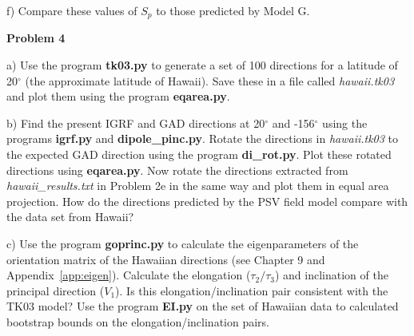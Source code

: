 {f) Compare these values of $S_p$   to those predicted by Model G. 



{\bf Problem 4}

a) Use the program {\bf tk03.py} to generate a set of 100 directions for a latitude of 20$^{\circ}$ (the approximate latitude of Hawaii). Save these in a file called {\it hawaii.tk03} and plot them using the program {\bf eqarea.py}.  

b)  Find the present IGRF and GAD directions at 20$^{\circ}$ and -156$^{\circ}$ using the programs {\bf igrf.py} and {\bf dipole\_pinc.py}.    Rotate the directions in {\it hawaii.tk03}  to the expected GAD direction using the program {\bf di\_rot.py}.  
Plot these rotated directions using {\bf eqarea.py}.  Now rotate the directions extracted from {\it hawaii\_results.txt} in Problem 2e in the same way and plot them in equal area projection.  How do the directions predicted by the PSV field model compare with the data set from Hawaii?  

c) Use the program {\bf goprinc.py} to calculate the eigenparameters of the orientation matrix of the Hawaiian directions (see Chapter 9 and Appendix~\ref{app:eigen}).   Calculate the elongation ($\tau_2/\tau_3$) and inclination of the principal direction ($V_1$).  Is this elongation/inclination pair consistent with the TK03 model?  Use the program {\bf EI.py} on the set of  Hawaiian data to calculated bootstrap bounds on the elongation/inclination pairs.


}





